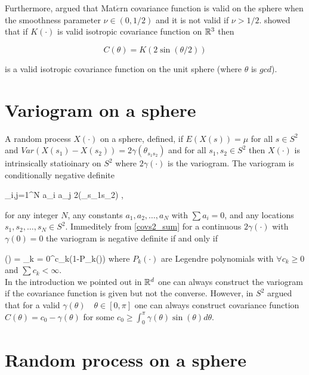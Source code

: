 	Furthermore, \cite{Gneiting2013} argued that Mat$\acute{e}$rn covariance function is valid on the sphere when the smoothness parameter $\nu\in(0,1/2)$ and it is not valid if $\nu>1/2$. \cite{Yadrenko1983} showed that if $K(\cdot)$ is valid isotropic covariance function on $\mathbb{R}^3$ then
	
	\[
		C(\theta) = K(2\sin(\theta/2))
	\]
	
	is a valid isotropic covariance function on the unit sphere (where $\theta$ is $gcd$).
	
	\section{Variogram on a sphere}
	
	
	A random process $X(\cdot)$ on a sphere, \cite{HuangZhangRobeson2011} defined, if $E(X(s))=\mu$ for all $s\in S^2$ and $Var(X(s_1)-X(s_2)) = 2\gamma(\theta_{s_1s_2})$ and for all $s_1, s_2 \in S^2$ then $X(\cdot)$ is intrinsically statioinary on $S^2$ where $2\gamma(\cdot)$ is the variogram. The variogram is conditionally negative definite
	
	\beq
	\sum_{i,j=1}^{N} a_i a_j 2\gamma(\theta_{s_1s_2}) ,
	\eeq
	
	for any integer $N$, any constants $a_1, a_2, \ldots, a_N$ with $\sum a_i = 0$, and any locations $s_1, s_2, \ldots, s_N \in S^2$. Immeditely from \ref{covs2_sum} for a continuous $2\gamma(\cdot)$ with $\gamma(0)=0$ the variogram is negative definite if and only if 
	
	\beq \label{covs2_sum}
	\gamma(\theta) = \sum_{k = 0}^\infty c_k(1-P_k(\cos\theta))
	\eeq
	where $P_{k}(\cdot)$ are Legendre polynomials with $\forall c_k\ge 0$ and $\sum c_k < \infty$. \\
	
	In the introduction we pointed out in $\mathbb{R}^d$ one can always construct the variogram if the covariance function is given but not the converse. However, in $S^2$ \cite{Yaglom1961} argued that for a valid $\gamma(\theta) \quad \theta \in [0,\pi]$ one can always construct covariance function $C(\theta)=c_0-\gamma(\theta)$ for some $c_0 \ge \int_0^{\pi} \gamma(\theta)\sin(\theta)d\theta$. 
	
	\section{Random process on a sphere}
	
